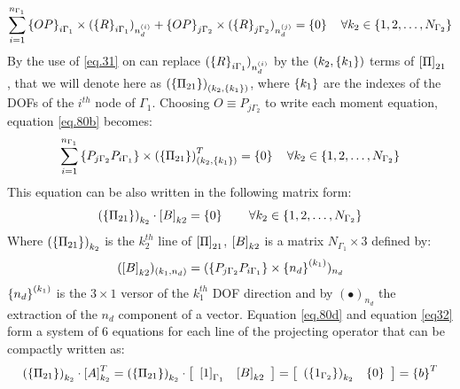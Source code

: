 \begin{eqnarray}
\label{eq.80b}
\begin{aligned}
\sum_{i=1}^{n_{\Gamma_1}}\left\lbrace{OP}\right \rbrace_{i\Gamma_1}\times (\left\lbrace{R}\right \rbrace_{i\Gamma_1})_{n_d^{(i)}}+\left\lbrace{OP}\right \rbrace_{j\Gamma_2}\times (\left\lbrace{R}\right \rbrace_{j\Gamma_2})_{n_d^{(j)}}=\left\lbrace{0}\right \rbrace \quad \forall k_2\in \lbrace1,2,\dots,N_{\Gamma_2} \rbrace
\end{aligned}
\end{eqnarray}
By the use of \eqref{eq.31} on can replace $(\left\lbrace{R}\right \rbrace_{i\Gamma_1})_{n_d^{(i)}}$ by the $(k_2,\left\lbrace{k_1}\right \rbrace)$ terms of $\left[{\Pi}\right]_{21}$ , that we will denote here as $\left(\left\lbrace{\Pi_{21}}\right \rbrace\right)_{(k_2,\left\lbrace{k_1}\right \rbrace)}$, where   $\left\lbrace{k_1}\right \rbrace$ are the indexes of the DOFs of the $i^{th}$ node of $\Gamma_1$. Choosing $O \equiv P_{j\Gamma_2} $ to write each moment equation, equation \eqref{eq.80b} becomes:
\begin{eqnarray}
\label{eq.80c}
\begin{aligned}
\sum_{i=1}^{n_{\Gamma_1}}\left\lbrace{P_{j\Gamma_2}P_{i\Gamma_1}}\right \rbrace\times \left(\left\lbrace{\Pi_{21}}\right \rbrace\right)_{(k_2,\left\lbrace{k_1}\right \rbrace)}^T=\left\lbrace{0}\right \rbrace \quad \forall k_2\in \lbrace1,2,\dots,N_{\Gamma_2} \rbrace
\end{aligned}
\end{eqnarray}
This equation can be also written in the following matrix form:
\begin{eqnarray}
\label{eq.80d}
\left(\left\lbrace{\Pi_{21}}\right \rbrace\right)_{k_2}\cdot\left[{B}\right]_{k2}=\left\lbrace{0}\right \rbrace \qquad \forall k_2\in \lbrace1,2,\dots,N_{\Gamma_2} \rbrace
\end{eqnarray}
Where $\left(\left\lbrace{\Pi_{21}}\right \rbrace\right)_{k_2}$ is the $k_2^{th}$ line of $\left[{\Pi}\right]_{21}$, $\left[{B}\right]_{k2}$ is a matrix $N_{\Gamma_1}\times3$ defined by:
\begin{eqnarray}
\label{eq.80e}
(\left[{B}\right]_{k2})_{(k_1,n_d)}=(\left\lbrace{P_{j\Gamma_2}P_{i\Gamma_1}}\right \rbrace\times\left\lbrace{n_d}\right \rbrace^{(k_1)})_{n_d}
\end{eqnarray}
 $\left\lbrace{n_d}\right \rbrace^{(k_1)}$ is the $3\times1$ versor of the $k_1^{th}$ DOF direction and by $(\bullet)_{n_d}$ the extraction of the  ${n_d}$ component of a vector. Equation \eqref{eq.80d} and equation \eqref{eq32} form a system of 6 equations for each line of the projecting operator that can be compactly written as:
 \begin{equation}
 \label{eq.80f}
 \left(\left\lbrace{\Pi_{21}}\right \rbrace\right)_{k_2}\cdot\left[{A}\right]_{k_2}^T=\left(\left\lbrace{\Pi_{21}}\right \rbrace\right)_{k_2}\cdot\left[
 \begin{array}{c c}
   \left[{1}\right]_{\Gamma_1}&
   \left[{B}\right]_{k2}
 \end{array}
 \right]=\left[\begin{array}{c c}
   \left(\left\lbrace{1_{\Gamma_2}}\right \rbrace\right)_{k_2}&
   \left\lbrace{0}\right \rbrace
 \end{array}
 \right]=\left\lbrace{b}\right \rbrace^T
 \end{equation}
